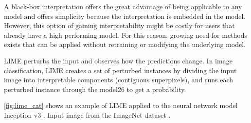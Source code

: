 A black-box interpretation offers the great advantage of being applicable to any model and offers simplicity because the interpretation is embedded in the model. However, this option of gaining interpretability might be costly for users that already have a high performing model. For this reason, growing need for methods exists that can be applied without retraining or modifying the underlying model.



LIME \cite{ribeiro2016should} perturbs the input and observes how the predictions change. In image classification,  LIME creates a set of perturbed instances by dividing the input image into interpretable components (contiguous superpixels), and runs each perturbed instance through the model26
to get a probability.

\autoref{fig:lime_cat} shows an example of LIME applied to the neural network model Inception-v3 \cite{szegedy2016rethinking}. Input image from the ImageNet dataset \cite{ILSVRC15}.

